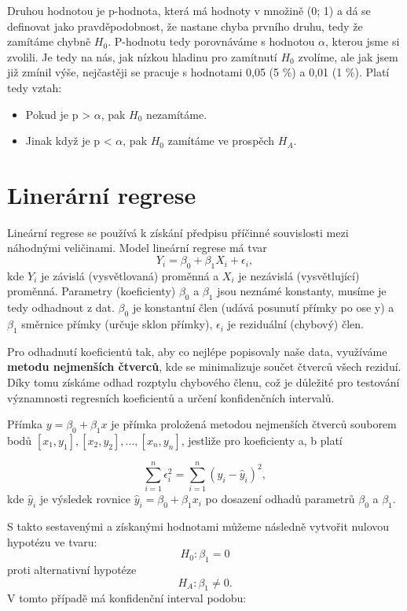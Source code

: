 \documentclass[thesis=M,czech]{FITthesis}[2022/10/08]
\begin{document}
Druhou hodnotou je p-hodnota, která má hodnoty v množině (0; 1) a dá se definovat jako pravděpodobnost, že nastane chyba prvního druhu, tedy že zamítáme chybně $H_0$. P-hodnotu tedy porovnáváme s hodnotou $\alpha$, kterou jsme si zvolili. Je tedy na nás, jak nízkou hladinu pro zamítnutí $H_0$ zvolíme, ale jak jsem již zmínil výše, nejčastěji se pracuje s hodnotami 0,05 (5 \%) a 0,01 (1 \%). Platí tedy vztah:
\begin{itemize}
    \item Pokud je p > $\alpha$, pak $H_0$ nezamítáme.
    \item Jinak když je p < $\alpha$, pak $H_0$ zamítáme ve prospěch $H_A$.
\end{itemize}

\section{Linerární regrese}
Lineární regrese se používá k získání předpisu příčinné souvislosti mezi náhodnými veličinami. Model lineární regrese má tvar 
\[Y_i = \beta_0 + \beta_1 X_i + \epsilon_i,\] 
kde $Y_i$ je závislá (vysvětlovaná) proměnná a $X_i$ je nezávislá (vysvětlující) proměnná. 
Parametry (koeficienty) $\beta_0$ a $\beta_1$ jsou neznámé konstanty, musíme je tedy odhadnout z dat. $\beta_0$ je konstantní člen (udává posunutí přímky po ose y) a $\beta_1$ směrnice přímky (určuje sklon přímky), $\epsilon_i$  je reziduální (chybový) člen. \cite{linreg}

Pro odhadnutí koeficientů tak, aby co nejlépe popisovaly naše data, využíváme \textbf{metodu nejmenších čtverců}, kde se minimalizuje součet čtverců všech reziduí. Díky tomu získáme odhad rozptylu chybového členu, což je důležité pro testování významnosti regresních koeficientů a určení konfidenčních intervalů.

Přímka $y = \beta_0 + \beta_1 x$ je přímka proložená metodou nejmenších čtverců souborem bodů $[x_1, y_1], [x_2, y_2], . . . , [x_n, y_n]$, jestliže pro koeficienty a, b platí

\[\sum_{i=1}^n \epsilon_i^2 = \sum_{i=1}^n (y_i - \widehat{y}_i)^2, \]
kde $\widehat{y}_i$ je výsledek rovnice  $\widehat{y}_i = \beta_0 + \beta_1 x_i$ po dosazení odhadů parametrů $\beta_0$ a $\beta_1$.

S takto sestavenými a získanými hodnotami můžeme následně vytvořit nulovou hypotézu ve tvaru:
\[H_0: \beta_1 = 0\]
proti alternativní hypotéze
\[H_A: \beta_1 \ne 0.\]
V tomto případě má konfidenční interval podobu:
\end{document}
